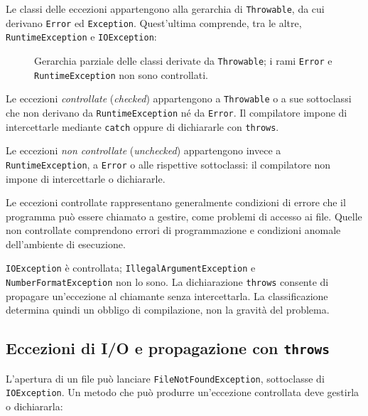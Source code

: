 Le classi delle eccezioni appartengono alla gerarchia di
\texttt{Throwable}, da cui derivano \texttt{Error} ed
\texttt{Exception}. Quest'ultima comprende, tra le altre,
\texttt{RuntimeException} e \texttt{IOException}:

\begin{figure}[htbp]
  \centering
  
  \caption{Gerarchia parziale delle classi derivate da
  \texttt{Throwable}; i rami \texttt{Error} e
  \texttt{RuntimeException} non sono controllati.}
  \label{fig:fi-java-file-gerarchia-eccezioni}
\end{figure}

\begin{definition}
\label{def:fi-java-file-checked}
Le eccezioni \emph{controllate} (\emph{checked}) appartengono
a \texttt{Throwable} o a sue sottoclassi che non derivano da
\texttt{RuntimeException} né da \texttt{Error}. Il compilatore
impone di intercettarle mediante \texttt{catch} oppure di
dichiararle con \texttt{throws}.

Le eccezioni \emph{non controllate} (\emph{unchecked})
appartengono invece a \texttt{RuntimeException}, a \texttt{Error}
o alle rispettive sottoclassi: il compilatore non impone
di intercettarle o dichiararle.
\end{definition}

Le eccezioni controllate rappresentano generalmente condizioni
di errore che il programma può essere chiamato a gestire,
come problemi di accesso ai file. Quelle non controllate
comprendono errori di programmazione e condizioni anomale
dell'ambiente di esecuzione.

\texttt{IOException} è controllata; \texttt{IllegalArgumentException}
e \texttt{NumberFormatException} non lo sono.
La dichiarazione \texttt{throws} consente di propagare
un'eccezione al chiamante senza intercettarla.
La classificazione determina quindi un obbligo di
compilazione, non la gravità del problema.

\clearpage

\subsection{Eccezioni di I/O e propagazione con \texttt{throws}}
\label{sec:fi-java-file-io-throws}

L'apertura di un file può lanciare \texttt{FileNotFoundException},
sottoclasse di \texttt{IOException}. Un metodo che può produrre
un'eccezione controllata deve gestirla o dichiararla:

